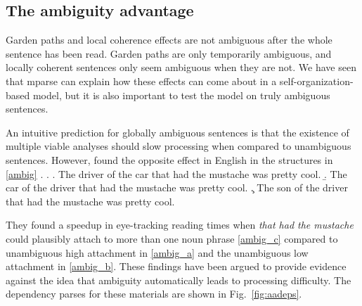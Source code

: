 \documentclass[a4paper, 12pt]{article}
\begin{document}
\subsection{The ambiguity advantage}
Garden paths and local coherence effects are not ambiguous after the whole
sentence has been read. Garden paths are only temporarily ambiguous, and
locally coherent sentences only seem ambiguous when they are not. We have seen
that mparse can explain how these effects can come about in a
self-organization-based model, but it is also important to test the model on truly
ambiguous sentences.

An intuitive prediction for globally ambiguous sentences is that the existence
of multiple viable analyses should slow processing when compared to unambiguous
sentences. However, \citet{traxler1998adjunct} found the
opposite effect in English in the structures in \ref{ambig} \citep[see
also][]{vangompel2001reanalysis, vangompel2005evidence,
    swets2008underspecification}. \ex. \label{ambig} \a. \label{ambig_a} The
driver of the car that had the mustache was pretty cool. \b.  \label{ambig_b}
The car of the driver that had the mustache was pretty cool.  \c.
\label{ambig_c} The son of the driver that had the mustache was pretty cool.
 
They found a speedup in eye-tracking reading times when \emph{that had the
    mustache} could plausibly attach to more than one noun phrase \ref{ambig_c}
compared to unambiguous high attachment in \ref{ambig_a} and the unambiguous
low attachment in \ref{ambig_b}. These findings have been argued to provide
evidence against the idea that ambiguity automatically leads to processing
difficulty. The dependency parses for these materials are shown in
Fig.~\ref{fig:aadeps}.
\end{document}

